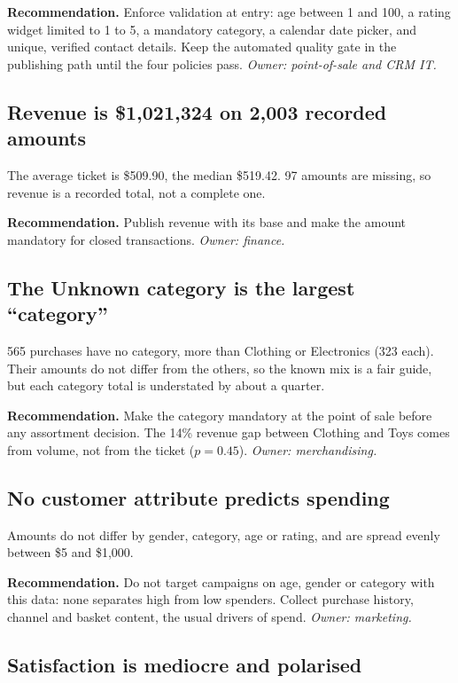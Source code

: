 \documentclass[12pt,a4paper]{article}
\begin{document}
\textbf{Recommendation.} Enforce validation at entry: age between 1 and 100, a rating
widget limited to 1 to 5, a mandatory category, a calendar date picker, and unique,
verified contact details. Keep the automated quality gate in the publishing path
until the four policies pass. \emph{Owner: point-of-sale and CRM IT.}

\subsection{Revenue is \$1{,}021{,}324 on 2{,}003 recorded amounts}

The average ticket is \$509.90, the median \$519.42. 97 amounts are missing, so
revenue is a recorded total, not a complete one.

\textbf{Recommendation.} Publish revenue with its base and make the amount mandatory
for closed transactions. \emph{Owner: finance.}

\subsection{The Unknown category is the largest ``category''}

565 purchases have no category, more than Clothing or Electronics (323 each). Their
amounts do not differ from the others, so the known mix is a fair guide, but each
category total is understated by about a quarter.

\textbf{Recommendation.} Make the category mandatory at the point of sale before any
assortment decision. The 14\% revenue gap between Clothing and Toys comes from volume,
not from the ticket ($p = 0.45$). \emph{Owner: merchandising.}

\subsection{No customer attribute predicts spending}

Amounts do not differ by gender, category, age or rating, and are spread evenly
between \$5 and \$1{,}000.

\textbf{Recommendation.} Do not target campaigns on age, gender or category with
this data: none separates high from low spenders. Collect purchase history, channel
and basket content, the usual drivers of spend. \emph{Owner: marketing.}

\subsection{Satisfaction is mediocre and polarised}
\end{document}
